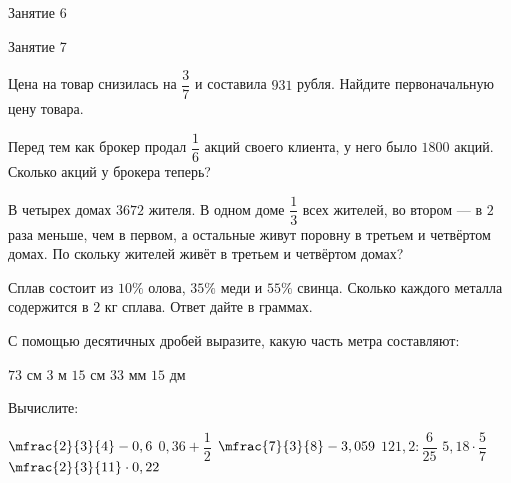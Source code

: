 \begin{class}[number=6]
	\begin{listofex}
		\item Занятие 6
	\end{listofex}
\end{class}

\begin{class}[number=7]
	\begin{listofex}
		\item Занятие 7
	\end{listofex}
\end{class}

\begin{homework}[number=1]
	\begin{listofex}
		\item Цена на товар снизилась на \(\dfrac{3}{7}\) и составила \(931\) рубля. Найдите первоначальную цену товара.
		\item Перед тем как брокер продал \( \dfrac{1}{6} \) акций своего клиента, у него было \(1800\) акций. Сколько акций у брокера теперь?
		\item В четырех домах \(3672\) жителя. В одном доме \(\dfrac{1}{3}\) всех жителей, во втором --- в \(2\) раза меньше, чем в первом, а остальные живут поровну в третьем и четвёртом домах. По скольку жителей живёт в третьем и четвёртом домах?
		\item Сплав состоит из \(10 \%\) олова, \(35\%\) меди и \(55\%\) свинца. Сколько каждого металла содержится в \(2\) кг сплава. Ответ дайте в граммах.
		\item С помощью десятичных дробей выразите, какую часть метра составляют:
		\begin{itasks}[4]
			\task \(73\) см
			\task \(3\) м \(15\) см
			\task \(33\) мм
			\task \(15\) дм
		\end{itasks}
		\item Вычислите:
		\begin{itasks}[3]
			\task \(\mfrac{2}{3}{4}-0,6\) 
			\task \( 0,36+\dfrac{1}{2} \)
			\task \(\mfrac{7}{3}{8}-3,059\)
			\task \(121,2:\dfrac{6}{25}\)
			\task \( 5,18 \cdot \dfrac{5}{7} \) 
			\task \( \mfrac{2}{3}{11} \cdot 0,22 \)
		\end{itasks}
	\end{listofex}
\end{homework}

